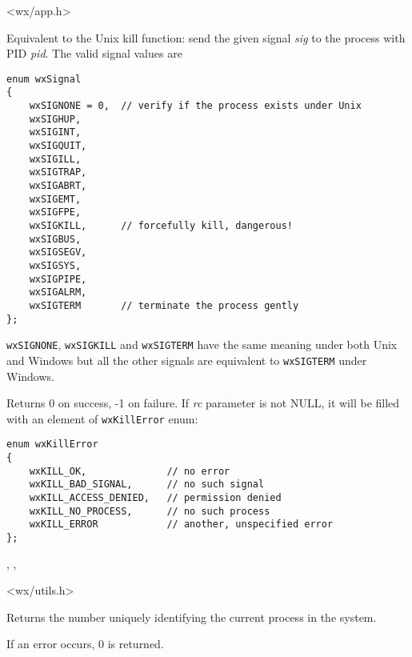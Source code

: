 
<wx/app.h>

\label{wxkill}


Equivalent to the Unix kill function: send the given signal {\it sig} to the
process with PID {\it pid}. The valid signal values are

\begin{verbatim}
enum wxSignal
{
    wxSIGNONE = 0,  // verify if the process exists under Unix
    wxSIGHUP,
    wxSIGINT,
    wxSIGQUIT,
    wxSIGILL,
    wxSIGTRAP,
    wxSIGABRT,
    wxSIGEMT,
    wxSIGFPE,
    wxSIGKILL,      // forcefully kill, dangerous!
    wxSIGBUS,
    wxSIGSEGV,
    wxSIGSYS,
    wxSIGPIPE,
    wxSIGALRM,
    wxSIGTERM       // terminate the process gently
};
\end{verbatim}

{\tt wxSIGNONE}, {\tt wxSIGKILL} and {\tt wxSIGTERM} have the same meaning
under both Unix and Windows but all the other signals are equivalent to
{\tt wxSIGTERM} under Windows.

Returns 0 on success, -1 on failure. If {\it rc} parameter is not NULL, it will
be filled with an element of {\tt wxKillError} enum:

\begin{verbatim}
enum wxKillError
{
    wxKILL_OK,              // no error
    wxKILL_BAD_SIGNAL,      // no such signal
    wxKILL_ACCESS_DENIED,   // permission denied
    wxKILL_NO_PROCESS,      // no such process
    wxKILL_ERROR            // another, unspecified error
};
\end{verbatim}


,\rtfsp
{},\rtfsp
{}


<wx/utils.h>

\label{wxgetprocessid}


Returns the number uniquely identifying the current process in the system.

If an error occurs, $0$ is returned.


